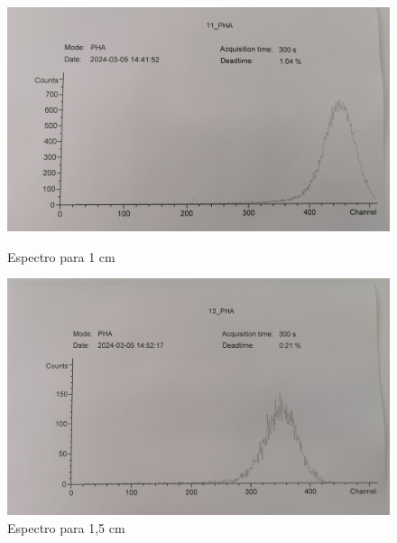 \documentclass[a4paper,12pt,spanish]{article}
\begin{document}
	 \begin{figure}[H]
	 	
	 	\centering
	 	\begin{minipage}{0.45\textwidth}
	 		\centering
	 		\includegraphics[width=1.1\textwidth]{"graficas recortadas/11"} %
	 		\caption*{Espectro para 1 cm}
	 	\end{minipage}\hfill
	 	\begin{minipage}{0.45\textwidth}
	 		\centering
	 		\includegraphics[width=1.1\textwidth]{"graficas recortadas/12"} %
	 		\caption*{Espectro para 1,5 cm}
	 	\end{minipage}
 	

\end{figure}
\end{document}
